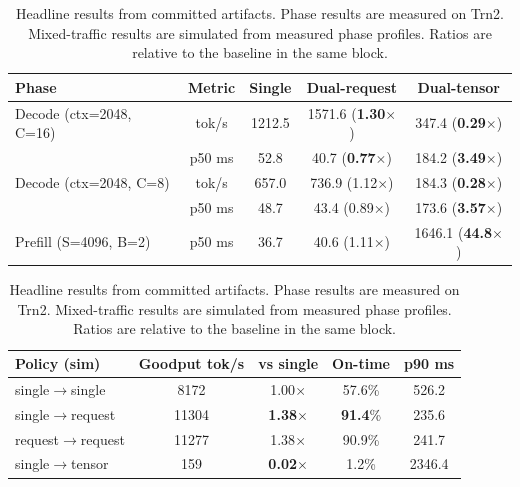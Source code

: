 \begin{table}[t]
  \centering
  \caption{Headline results from committed artifacts. Phase results are measured on Trn2. Mixed-traffic results are simulated from measured phase profiles. Ratios are relative to the baseline in the same block.}
  \label{tab:headline}
  \footnotesize
  \begin{minipage}{0.62\textwidth}
    \centering
    \begin{tabular}{lcccc}
      \toprule
      Phase & Metric & Single & Dual-request & Dual-tensor \\
      \midrule
      Decode (ctx=2048, C=16) & tok/s & 1212.5 & 1571.6 (\textbf{1.30}$\times$) & 347.4 (\textbf{0.29}$\times$) \\
      & p50 ms & 52.8 & 40.7 (\textbf{0.77}$\times$) & 184.2 (\textbf{3.49}$\times$) \\
      Decode (ctx=2048, C=8) & tok/s & 657.0 & 736.9 (1.12$\times$) & 184.3 (\textbf{0.28}$\times$) \\
      & p50 ms & 48.7 & 43.4 (0.89$\times$) & 173.6 (\textbf{3.57}$\times$) \\
      Prefill (S=4096, B=2) & p50 ms & 36.7 & 40.6 (1.11$\times$) & 1646.1 (\textbf{44.8}$\times$) \\
      \bottomrule
    \end{tabular}
  \end{minipage}
  \hfill
  \begin{minipage}{0.36\textwidth}
    \centering
    \begin{tabular}{lcccc}
      \toprule
      Policy (sim) & Goodput tok/s & vs single & On-time & p90 ms \\
      \midrule
      single$\rightarrow$single & 8172 & 1.00$\times$ & 57.6\% & 526.2 \\
      single$\rightarrow$request & 11304 & \textbf{1.38}$\times$ & \textbf{91.4}\% & 235.6 \\
      request$\rightarrow$request & 11277 & 1.38$\times$ & 90.9\% & 241.7 \\
      single$\rightarrow$tensor & 159 & \textbf{0.02}$\times$ & 1.2\% & 2346.4 \\
      \bottomrule
    \end{tabular}
  \end{minipage}
\end{table}
